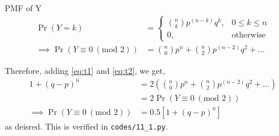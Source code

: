 \documentclass{beamer}
\providecommand{\pr}[1]{\ensuremath{\Pr\left(#1\right)}}
\begin{document}
\begin{frame}
    \begin{alertblock}{PMF of Y}
        \begin{align}
            \pr{Y = k} &= 
            \begin{cases}
                \binom{n}{k}p^{(n - k)}q^k, & 0 \leq k \leq n \\
                0, & \textrm{otherwise} 
            \end{cases}  \\
            \implies \pr{Y \equiv 0\ (\textrm{mod } 2)} &= \binom{n}{0}p^n + \binom{n}{2}p^{(n - 2)}q^2 + \ldots
        \end{align}
    \end{alertblock}
    Therefore, adding \autoref{eq:t1} and \autoref{eq:t2}, we get,
    \begin{align}
        1 + (q - p)^n &= 2(\binom{n}{0}p^n + \binom{n}{2}p^{(n - 2)}q^2 + \ldots) \\ 
        &= 2\pr{Y \equiv 0\ (\textrm{mod } 2)} \\
        \implies \pr{Y \equiv 0\ (\textrm{mod } 2)} &= 0.5[1 + (q - p)^n]
        \label{eq:proof}
    \end{align}
    as deisred. This is verified in \texttt{codes/11\_1.py}.
\end{frame}
\end{document}
